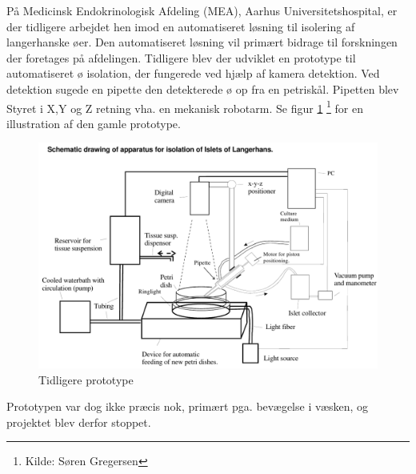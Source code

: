 \newpage
På Medicinsk Endokrinologisk Afdeling (MEA), Aarhus Universitetshospital, er der tidligere arbejdet hen imod en automatiseret løsning til isolering af langerhanske øer. Den automatiseret løsning vil primært bidrage til forskningen der foretages på afdelingen. Tidligere blev der udviklet en prototype til automatiseret ø isolation, der fungerede ved hjælp af kamera detektion. Ved detektion sugede en pipette den detekterede ø op fra en petriskål. Pipetten blev Styret i X,Y og Z retning vha. en mekanisk robotarm. Se figur \ref{fig:Tidliger prototype} \footnote{Kilde: Søren Gregersen} for en illustration af den gamle prototype.

\begin{figure}[H]
	\centering
	\includegraphics[width=1\textwidth]{billeder/hovedrapport/glprototype.pdf}
	\caption{Tidligere prototype}
	\label{fig:Tidliger prototype}
\end{figure}


 Prototypen var dog ikke præcis nok, primært pga. bevægelse i væsken, og projektet blev derfor stoppet.
 

%
%
%
% 
% 
% 
% 
% 

